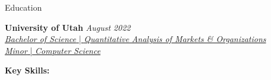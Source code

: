 \documentclass{resume/resume}
\begin{document}
\begin{rSection}{Education}

{\bf University of Utah} \hfill {\em August 2022}
\vspace{2pt}
  \\ \href{https://eccles.utah.edu/programs/undergraduate/academics/majors/qamo/}{{\em Bachelor of Science} | {\em Quantitative Analysis of Markets \& Organizations}
  }
  \\ \href{https://github.com/search?o=desc&q=user\%3ASpelkington&s=updated&type=Repositories}{{\em Minor} | {\em Computer Science}}

%
%
%
%
%
%
%   
%
%
%
%

%
%
{\bf Key Skills:}
\vspace{-1.83em}


\end{rSection}
\end{document}
